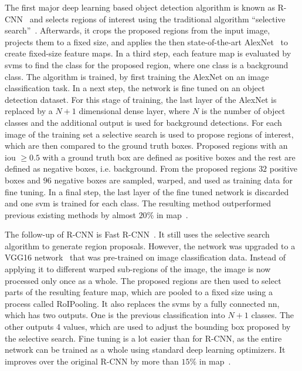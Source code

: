 The first major deep learning based object detection algorithm is known as R-CNN~\cite{Girshick:2013aaa} and selects regions of interest using the traditional algorithm ``selective search''~\cite{Uijlings:2013aaa}. Afterwards, it crops the proposed regions from the input image, projects them to a fixed size, and applies the then state-of-the-art AlexNet~\cite{krizhevsky:2012} to create fixed-size feature maps. In a third step, each feature map is evaluated by \acrshort{svm}s to find the class for the proposed region, where one class is a background class. The algorithm is trained, by first training the AlexNet on an image classification task. In a next step, the network is fine tuned on an object detection dataset. For this stage of training, the last layer of the AlexNet is replaced by a $N+1$ dimensional dense layer, where $N$ is the number of object classes and the additional output is used for background detections. For each image of the training set a selective search is used to propose regions of interest, which are then compared to the ground truth boxes. Proposed regions with an \acrshort{iou} $\geq 0.5$ with a ground truth box are defined as positive boxes and the rest are defined as negative boxes, i.e. background. From the proposed regions $32$ positive boxes and $96$ negative boxes are sampled, warped, and used as training data for fine tuning. In a final step, the last layer of the fine tuned network is discarded and one \acrshort{svm} is trained for each class. The resulting method outperformed previous existing methods by almost $20\%$ in \acrshort{map}~\cite{Girshick:2013aaa}.

The follow-up of R-CNN is Fast R-CNN~\cite{Girshick:2015aaa}. It still uses the selective search algorithm to generate region proposals. However, the network was upgraded to a VGG16 network~\cite{Simonyan:2014aaa} that was pre-trained on image classification data. Instead of applying it to different warped sub-regions of the image, the image is now processed only once as a whole. The proposed regions are then used to select parts of the resulting feature map, which are pooled to a fixed size using a process called RoIPooling. It also replaces the \acrshort{svm}s by a fully connected \acrshort{nn}, which has two outputs. One is the previous classification into $N+1$ classes. The other outputs 4 values, which are used to adjust the bounding box proposed by the selective search. Fine tuning is a lot easier than for R-CNN, as the entire network can be trained as a whole using standard deep learning optimizers. It improves over the original R-CNN by more than $15\%$ in \acrshort{map}~\cite{Girshick:2015aaa}.


